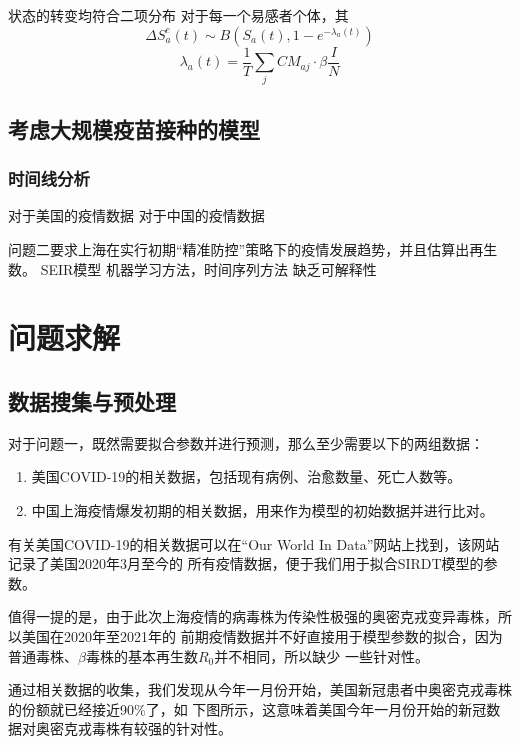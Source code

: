 \documentclass[bwprint]{gmcmthesis}
\numberwithin{figure}{section}
\begin{document}
\par 状态的转变均符合二项分布
对于每一个易感者个体，其
\begin{equation}
\Delta S^e_a(t)\sim B(S_a(t),1-e^{-\lambda_a(t)})
\end{equation}
\begin{equation}
\lambda_a(t)=\frac{1}{T}\sum_jCM_{aj}\cdot\beta\frac{I}{N}
\end{equation}
\subsection{考虑大规模疫苗接种的模型}
\subsubsection{时间线分析}

对于美国的疫情数据
对于中国的疫情数据



问题二要求上海在实行初期“精准防控”策略下的疫情发展趋势，并且估算出再生数。
SEIR模型
机器学习方法，时间序列方法
缺乏可解释性

\section{问题求解}
\subsection{数据搜集与预处理}
\par 对于问题一，既然需要拟合参数并进行预测，那么至少需要以下的两组数据：

\begin{enumerate}
    \item 美国COVID-19的相关数据，包括现有病例、治愈数量、死亡人数等。
    \item 中国上海疫情爆发初期的相关数据，用来作为模型的初始数据并进行比对。
\end{enumerate}

\par 有关美国COVID-19的相关数据可以在“Our World In Data”网站上找到，该网站记录了美国2020年3月至今的
所有疫情数据，便于我们用于拟合SIRDT模型的参数。

\par 值得一提的是，由于此次上海疫情的病毒株为传染性极强的奥密克戎变异毒株，所以美国在2020年至2021年的
前期疫情数据并不好直接用于模型参数的拟合，因为普通毒株、$\beta$毒株的基本再生数$R_0$并不相同，所以缺少
一些针对性。

\par 通过相关数据的收集，我们发现从今年一月份开始，美国新冠患者中奥密克戎毒株的份额就已经接近90$\%$了，如
下图所示，这意味着美国今年一月份开始的新冠数据对奥密克戎毒株有较强的针对性。
\end{document}
